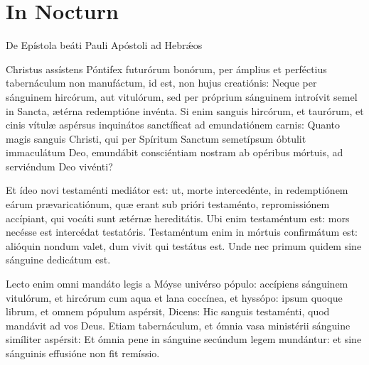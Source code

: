 \section*{In  Nocturn}









    \lesson

De Epístola beáti Pauli Apóstoli ad Hebrǽos


Christus assístens Póntifex futurórum bonórum, per ámplius et perféctius
tabernáculum non manufáctum, id est, non hujus creatiónis: Neque per sánguinem
hircórum, aut vitulórum, sed per próprium sánguinem introívit semel in Sancta,
ætérna redemptióne invénta. Si enim sanguis hircórum, et taurórum, et cinis
vítulæ aspérsus inquinátos sanctíficat ad emundatiónem carnis: Quanto magis
sanguis Christi, qui per Spíritum Sanctum semetípsum óbtulit immaculátum Deo,
emundábit consciéntiam nostram ab opéribus mórtuis, ad serviéndum Deo vivénti?


 \lesson


Et ídeo novi testaménti mediátor est: ut, morte intercedénte, in redemptiónem
eárum prævaricatiónum, quæ erant sub prióri testaménto, repromissiónem
accípiant, qui vocáti sunt ætérnæ hereditátis. Ubi enim testaméntum est: mors
necésse est intercédat testatóris. Testaméntum enim in mórtuis confirmátum est:
alióquin nondum valet, dum vivit qui testátus est. Unde nec primum quidem sine
sánguine dedicátum est.


 \lesson


Lecto enim omni mandáto legis a Móyse univérso pópulo: accípiens sánguinem
vitulórum, et hircórum cum aqua et lana coccínea, et hyssópo: ipsum quoque
librum, et omnem pópulum aspérsit, Dicens: Hic sanguis testaménti, quod
mandávit ad vos Deus. Etiam tabernáculum, et ómnia vasa ministérii sánguine
simíliter aspérsit: Et ómnia pene in sánguine secúndum legem mundántur: et sine
sánguinis effusióne non fit remíssio.


